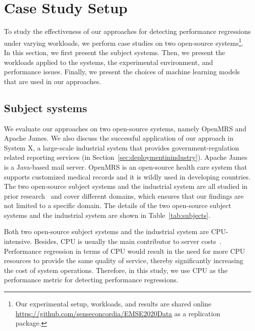 \section{Case Study Setup} \label{sec:casestudysetup}
To study the effectiveness of our approaches for detecting performance regressions under varying workloads, we perform case studies on two open-source systems\footnote{Our experimental setup, workloads, and results are shared online \url{https://github.com/senseconcordia/EMSE2020Data} as a replication package.}. In this section, we first present the subject systems. Then, we present the workloads applied to the systems, the experimental environment, and performance issues. Finally, we present the choices of machine learning models that are used in our approaches. 

\subsection{Subject systems}
We evaluate our approaches on two open-source systems, namely OpenMRS and Apache James. We also discuss the successful application of our approach in System X, a large-scale industrial system that provides government-regulation related reporting services (in Section~\ref{sec:deploymentinindustry}). Apache James is a Java-based mail server. OpenMRS is an open-source health care system that supports customized medical records and it is wildly used in developing countries. The two open-source subject systems and the industrial system are all studied in prior research~\citep{Yao:2018:LSL:3184407.3184416, DBLP:conf/icst/GaoJBL16} and cover different domains, which ensures that our findings are not limited to a specific domain. The details of the two open-source subject systems and the industrial system are shown in Table~\ref{tab:subjects}. 

Both two open-source subject systems and the industrial system are CPU-intensive. Besides, CPU is usually the main contributor to server costs~\citep{Greenberg:2008:CCR:1496091.1496103}. Performance regression in terms of CPU would result in the need for more CPU resources to provide the same quality of service, thereby significantly increasing the cost of system operations. 
Therefore, in this study, we use CPU as the performance metric for detecting performance regressions. 



